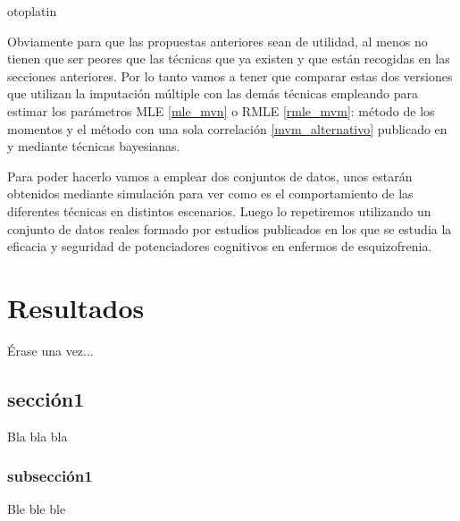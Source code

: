 otoplatin\documentclass[a4paper,openright,12pt]{report}
\begin{document}
Obviamente para que las propuestas anteriores sean de utilidad, al menos no tienen que ser peores que las técnicas que ya existen y que están recogidas en las secciones anteriores. Por lo tanto vamos a tener que comparar estas dos versiones que utilizan la imputación múltiple con las demás técnicas empleando para estimar los parámetros MLE \ref{mle_mvn} o RMLE \ref{rmle_mvm}: método de los momentos \cite{Jackson2010} y el método con una sola correlación \ref{mvm_alternativo} publicado en \cite{Riley2009} y mediante técnicas bayesianas. 

Para poder hacerlo vamos a emplear dos conjuntos de datos, unos estarán obtenidos mediante simulación para ver como es el comportamiento de las diferentes técnicas en distintos escenarios. Luego lo repetiremos utilizando un conjunto de datos reales formado por estudios publicados en los que se estudia la eficacia y seguridad de potenciadores cognitivos en enfermos de esquizofrenia.


\chapter{Resultados}\label{cap.resultados}
Érase una vez...
\section{sección1}
Bla bla bla
\subsection{subsección1}
Ble ble ble
\end{document}
